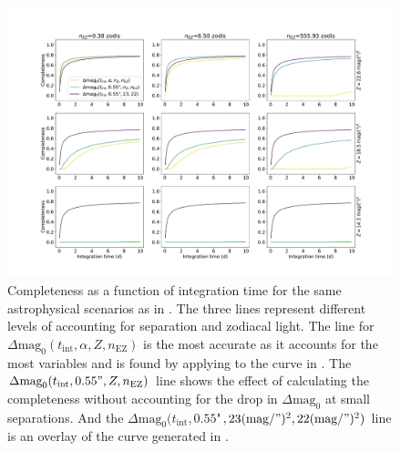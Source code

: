 \begin{figure}
  \begin{center}
    \includegraphics[width=\textwidth]{ch3/figures/Z_EZ_comps_flat.pdf}
  \end{center}
  \caption{Completeness as a function of integration time for the same astrophysical
  scenarios as in . The three lines represent different levels
  of accounting for separation and zodiacal light. The line for
  $\Delta\textrm{mag}_0(t_\textrm{int}, \alpha, Z, n_\textrm{EZ})$
  is the most accurate as it accounts for the most variables and is 
  found by applying  to the curve in .
  The 
  $\Delta\textrm{mag}_0(t_\textrm{int}, 0.55", Z, n_\textrm{EZ})$
  line shows the effect of calculating the completeness without accounting for
  the drop in $\Delta\textrm{mag}_0$ at small separations. And the
  $\Delta\mathrm{mag}_0(t_\mathrm{int}, 0.55$"$, 23 (\textrm{mag}/")^2, 22(\textrm{mag}/")^2)$
  line is an overlay of the curve generated in .
  }
  \label{fig:fZ_fEZ_comps}
\end{figure}

